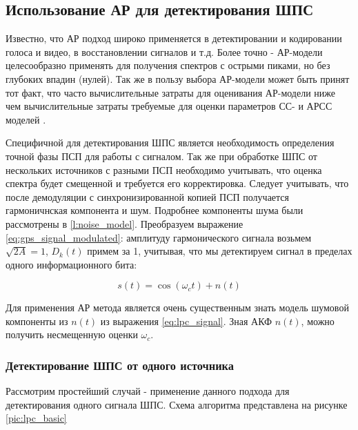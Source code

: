 \subsection{Использование АР для детектирования ШПС}
Известно, что АР подход широко применяется в детектировании и кодировании голоса и видео, в восстановлении сигналов и т.д.
Более точно - АР-модели целесообразно применять для получения спектров с острыми пиками, но без глубоких впадин (нулей).
Так же в пользу выбора АР-модели может быть принят тот факт, что часто вычислительные затраты для оценивания АР-модели 
ниже чем вычислительные затраты требуемые для оценки параметров СС- и АРСС моделей \cite{marpl_book}.

Специфичной для детектирования ШПС является необходимость определения точной фазы ПСП
для работы с сигналом. Так же при обработке ШПС от нескольких источников с разными ПСП необходимо учитывать,
что оценка спектра будет смещенной и требуется его корректировка. Следует учитывать, что после демодуляции
с синхронизированной копией ПСП получается гармоничнская компонента и шум. Подробнее компоненты шума были
рассмотрены в \ref{l:noise_model}. Преобразуем выражение \ref{eq:gps_signal_modulated}: амплитуду гармонического
сигнала возьмем ${\sqrt{2A} = 1}$, ${D_k(t)}$ примем за 1, учитывая, что мы детектируем сигнал в пределах одного
информационного бита:
\begin{center}
\begin{equation}
	\label{eq:lpc_signal}
	s(t) = \cos(\omega_{c}t) + n(t)
\end{equation}
\end{center}

Для применения АР метода является очень существенным знать модель шумовой компоненты из ${n(t)}$ из выражения
\ref{eq:lpc_signal}. Зная АКФ ${n(t)}$, можно получить несмещенную оценки ${\omega_c}$.

\subsubsection{Детектирование ШПС от одного источника}

Рассмотрим простейший случай - применение данного подхода для детектирования одного сигнала ШПС.
Схема алгоритма представлена на рисунке \ref{pic:lpc_basic}

